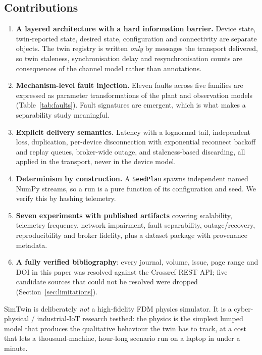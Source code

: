 \documentclass[preprint,12pt,authoryear,nopreprintline]{elsarticle}
\newcommand{\smt}{SimTwin}
\begin{document}
\subsection*{Contributions}
\begin{enumerate}
  \item \textbf{A layered architecture with a hard information barrier.}
        Device state, twin-reported state, desired state, configuration and
        connectivity are separate objects. The twin registry is written
        \emph{only} by messages the transport delivered, so twin staleness,
        synchronisation delay and resynchronisation counts are consequences of
        the channel model rather than annotations.
  \item \textbf{Mechanism-level fault injection.} Eleven faults across five
        families are expressed as parameter transformations of the plant and
        observation models (Table~\ref{tab:faults}). Fault signatures are
        emergent, which is what makes a separability study meaningful.
  \item \textbf{Explicit delivery semantics.} Latency with a lognormal tail,
        independent loss, duplication, per-device disconnection with exponential
        reconnect backoff and replay queues, broker-wide outage, and
        staleness-based discarding, all applied in the transport, never in the
        device model.
  \item \textbf{Determinism by construction.} A \texttt{SeedPlan} spawns
        independent named NumPy streams, so a run is a pure function of its
        configuration and seed. We verify this by hashing telemetry.
  \item \textbf{Seven experiments with published artifacts} covering
        scalability, telemetry frequency, network impairment, fault
        separability, outage/recovery, reproducibility and broker fidelity, plus
        a dataset package with provenance metadata.
  \item \textbf{A fully verified bibliography}: every journal, volume, issue,
        page range and DOI in this paper was resolved against the Crossref REST
        API; five candidate sources that could not be resolved were dropped
        (Section~\ref{sec:limitations}).
\end{enumerate}

\smt{} is deliberately \emph{not} a high-fidelity FDM physics simulator. It is a
cyber-physical / industrial-IoT research testbed: the physics is the simplest
lumped model that produces the qualitative behaviour the twin has to track, at a
cost that lets a thousand-machine, hour-long scenario run on a laptop in under a
minute.
\end{document}
